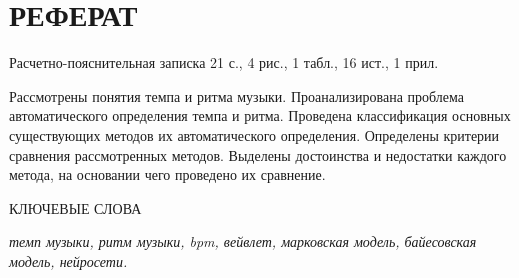 \section*{РЕФЕРАТ}

Расчетно-пояснительная записка 21 с., 4 рис., 1 табл., 16 ист., 1 прил.

Рассмотрены понятия темпа и ритма музыки. Проанализирована проблема автоматического определения темпа и ритма. Проведена классификация основных существующих методов их автоматического определения. Определены критерии сравнения рассмотренных методов. Выделены достоинства и недостатки каждого метода, на основании чего проведено их сравнение.

КЛЮЧЕВЫЕ СЛОВА

\textit{темп музыки, ритм музыки, bpm, вейвлет, марковская модель, байесовская модель, нейросети.}

\clearpage